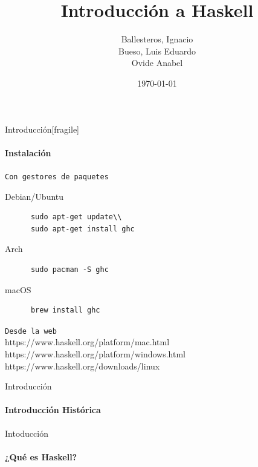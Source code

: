 \documentclass{beamer}
\title{Introducción a Haskell}
\subtitle{}
\date{\today}
\author{Ballesteros, Ignacio\\Bueso, Luis Eduardo\\Ovide Anabel}
\institute{\url{https://github.com/edububa/haskell_course}}
\begin{document}
\maketitle

\begin{frame}{Introducción}[fragile]
  \framesubtitle{Instalación}

  \texttt{Con gestores de paquetes}

  \begin{block}{Debian/Ubuntu}
    \begin{verbatim}
      sudo apt-get update\\
      sudo apt-get install ghc
    \end{verbatim}
  \end{block}

  \begin{block}{Arch}
    \begin{verbatim}
      sudo pacman -S ghc
    \end{verbatim}
  \end{block}

  \begin{block}{macOS}
    \begin{verbatim}
      brew install ghc
    \end{verbatim}
  \end{block}

  \texttt{Desde la web}\\
  https://www.haskell.org/platform/mac.html\\
  https://www.haskell.org/platform/windows.html\\
  https://www.haskell.org/downloads/linux

\end{frame}

\begin{frame}{Introducción}     %
  \framesubtitle{Introducción Histórica}

\end{frame}

\begin{frame}{Intoducción}      %
  \framesubtitle{¿Qué es Haskell?}

\end{frame}


\end{document}
